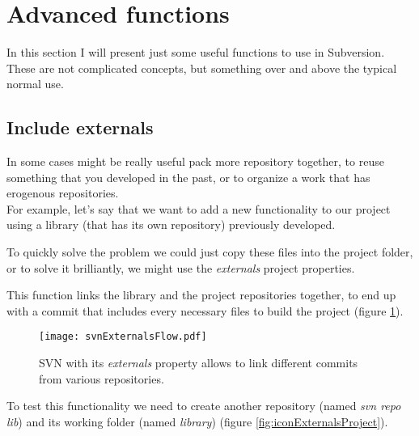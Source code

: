 \section{Advanced functions}
\label{section:AdvancedFunctions}

In this section I will present just some useful functions to use in Subversion. These are not complicated concepts, but something over and above the typical normal use.






\subsection{Include externals}
\label{subsection:externals}

In some cases might be really useful pack more repository together, to reuse something that you developed in the past, or to organize a work that has erogenous repositories.\\

For example, let's say that we want to add a new functionality to our project using a library (that has its own repository) previously developed.

To quickly solve the problem we could just copy these files into the project folder, or to solve it brilliantly, we might use the \textit{externals} project properties.


This function links the library and the project repositories together, to end up with a commit that includes every necessary files to build the project (figure \ref{fig:svnExternalsFlow}).\\






\begin{figure}[htbp]
    \centering
    \texttt{[image: svnExternalsFlow.pdf]}
    \caption{SVN with its \textit{externals} property allows to link different commits from various repositories.}
    \label{fig:svnExternalsFlow}
\end{figure}







To test this functionality we need to create another repository (named \textit{svn repo lib}) and its working folder (named \textit{library}) (figure \ref{fig:iconExternalsProject}).





